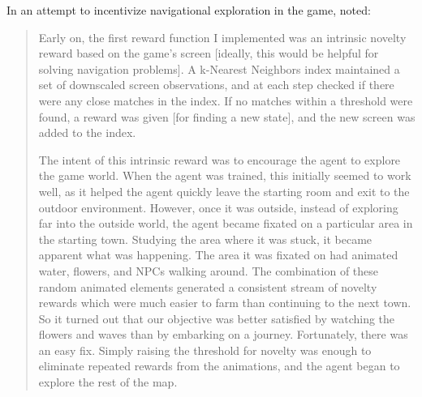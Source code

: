 In an attempt to incentivize navigational exploration in the game, \citet{PokemonRedExperiments} noted:

\begin{quote}

Early on, the first reward function I implemented was an intrinsic novelty reward based on the game's screen [ideally, this would be helpful for solving navigation problems]. A k-Nearest Neighbors index maintained a set of downscaled screen observations, and at each step checked if there were any close matches in the index. If no matches within a threshold were found, a reward was given [for finding a new state], and the new screen was added to the index.

The intent of this intrinsic reward was to encourage the agent to explore the game world. When the agent was trained, this initially seemed to work well, as it helped the agent quickly leave the starting room and exit to the outdoor environment. However, once it was outside, instead of exploring far into the outside world, the agent became fixated on a particular area in the starting town. Studying the area where it was stuck, it became apparent what was happening. The area it was fixated on had animated water, flowers, and NPCs walking around. The combination of these random animated elements generated a consistent stream of novelty rewards which were much easier to farm than continuing to the next town. So it turned out that our objective was better satisfied by watching the flowers and waves than by embarking on a journey.
Fortunately, there was an easy fix. Simply raising the threshold for novelty was enough to eliminate repeated rewards from the animations, and the agent began to explore the rest of the map.

\end{quote}
